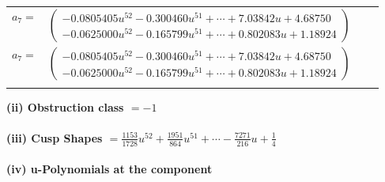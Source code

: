 \documentclass[1p]{elsarticle_modified}
\theoremstyle{definition}
\begin{document}
\begin{tabular}{m{7pt} m{180pt} m{7pt} m{180pt} }
\flushright $a_{7}=$&$\begin{pmatrix}-0.0805405 u^{52}-0.300460 u^{51}+\cdots+7.03842 u+4.68750\\-0.0625000 u^{52}-0.165799 u^{51}+\cdots+0.802083 u+1.18924\end{pmatrix}$\\ \flushright $a_{7}=$&$\begin{pmatrix}-0.0805405 u^{52}-0.300460 u^{51}+\cdots+7.03842 u+4.68750\\-0.0625000 u^{52}-0.165799 u^{51}+\cdots+0.802083 u+1.18924\end{pmatrix}$\\&\end{tabular}
\flushleft \textbf{(ii) Obstruction class $= -1$}\\~\\
\flushleft \textbf{(iii) Cusp Shapes $= \frac{1153}{1728} u^{52}+\frac{1951}{864} u^{51}+\cdots-\frac{7271}{216} u+\frac{1}{4}$}\\~\\
\newpage\renewcommand{\arraystretch}{1}
\flushleft \textbf{(iv) u-Polynomials at the component}\newline \\
\end{document}
